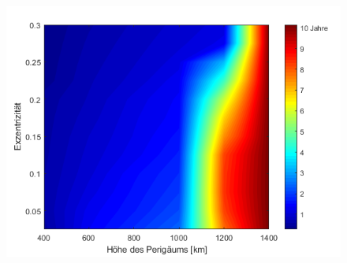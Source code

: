 \begin{figure}[h!]
	\centering
		\includegraphics[width=1.00\textwidth]{./graphics/GMAT/ecc_perigee_550kg.png}
	\label{fig:GMAT_ecc_550}
\end{figure}





